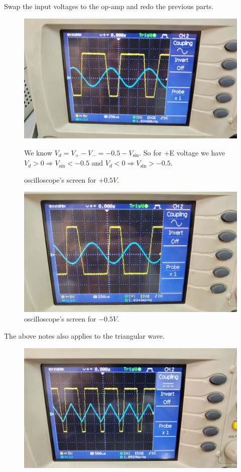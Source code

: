\documentclass[11pt]{article}
\newcommand{\PicScale}{0.2}
\begin{document}
\begin{question}
\begin{subquestion}{Swap the input voltages to the op-amp and redo the previous parts.}
{\begin{figure}[H]
                    \includegraphics[scale=\PicScale,angle=0]{Fig/12.jpeg}
                    \caption{oscilloscope's screen for $+0.5V$.}
                We know $V_d = V_+ - V_- = -0.5 - V_{\sin}$. So for +E voltage we have $V_d > 0 \Rightarrow V_{\sin} < -0.5$ and $V_d < 0 \Rightarrow V_{\sin} > -0.5$.
                \end{figure}
                \begin{figure}[H]
                    \centering
                    \includegraphics[scale=\PicScale,angle=0]{Fig/13.jpeg}
                    \caption{oscilloscope's screen for $-0.5V$.}
                \end{figure}
                The above notes also applies to the triangular wave.
                \begin{figure}[H]
                    \centering
                    \includegraphics[scale=\PicScale,angle=0]{Fig/53.jpeg}

\end{figure}}
\end{subquestion}
\end{question}
\end{document}

